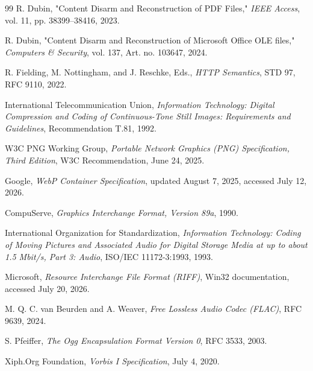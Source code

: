 \begin{thebibliography}{99}
R. Dubin, "Content Disarm and Reconstruction of PDF Files,"
\emph{IEEE Access}, vol. 11, pp. 38399--38416, 2023.

R. Dubin, "Content Disarm and Reconstruction of Microsoft Office OLE files,"
\emph{Computers \& Security}, vol. 137, Art. no. 103647, 2024.

R. Fielding, M. Nottingham, and J. Reschke, Eds.,
\emph{HTTP Semantics}, STD 97, RFC 9110, 2022.

International Telecommunication Union, \emph{Information Technology:
Digital Compression and Coding of Continuous-Tone Still Images:
Requirements and Guidelines}, Recommendation T.81, 1992.

W3C PNG Working Group, \emph{Portable Network Graphics (PNG)
Specification, Third Edition}, W3C Recommendation, June 24, 2025.

Google, \emph{WebP Container Specification}, updated August 7, 2025,
accessed July 12, 2026.

CompuServe, \emph{Graphics Interchange Format, Version 89a}, 1990.

International Organization for Standardization,
\emph{Information Technology: Coding of Moving Pictures and Associated
Audio for Digital Storage Media at up to about 1.5 Mbit/s, Part 3: Audio},
ISO/IEC 11172-3:1993, 1993.

Microsoft, \emph{Resource Interchange File Format (RIFF)},
Win32 documentation, accessed July 20, 2026.

M. Q. C. van Beurden and A. Weaver, \emph{Free Lossless Audio Codec
(FLAC)}, RFC 9639, 2024.

S. Pfeiffer, \emph{The Ogg Encapsulation Format Version 0}, RFC 3533,
2003.

Xiph.Org Foundation, \emph{Vorbis I Specification}, July 4, 2020.


\end{thebibliography}
